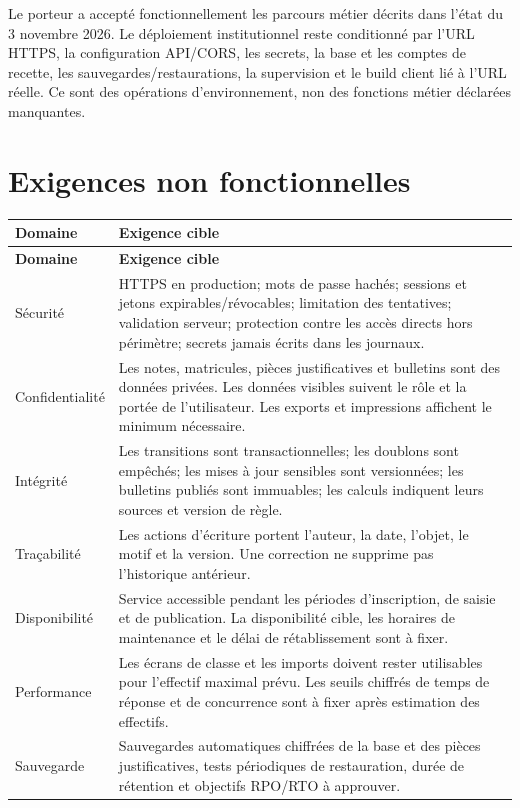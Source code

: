 \documentclass[11pt,a4paper]{article}
\begin{document}
Le porteur a accepté fonctionnellement les parcours métier décrits dans l’état du 3 novembre 2026. Le déploiement institutionnel reste conditionné par l’URL HTTPS, la configuration API/CORS, les secrets, la base et les comptes de recette, les sauvegardes/restaurations, la supervision et le build client lié à l’URL réelle. Ce sont des opérations d’environnement, non des fonctions métier déclarées manquantes.

\section{Exigences non fonctionnelles}

\begin{longtable}{L{3.2cm}L{12.1cm}}
\toprule
\textbf{Domaine} & \textbf{Exigence cible} \\
\midrule
\endfirsthead
\toprule
\textbf{Domaine} & \textbf{Exigence cible} \\
\midrule
\endhead
Sécurité & HTTPS en production; mots de passe hachés; sessions et jetons expirables/révocables; limitation des tentatives; validation serveur; protection contre les accès directs hors périmètre; secrets jamais écrits dans les journaux. \\
Confidentialité & Les notes, matricules, pièces justificatives et bulletins sont des données privées. Les données visibles suivent le rôle et la portée de l'utilisateur. Les exports et impressions affichent le minimum nécessaire. \\
Intégrité & Les transitions sont transactionnelles; les doublons sont empêchés; les mises à jour sensibles sont versionnées; les bulletins publiés sont immuables; les calculs indiquent leurs sources et version de règle. \\
Traçabilité & Les actions d'écriture portent l'auteur, la date, l'objet, le motif et la version. Une correction ne supprime pas l'historique antérieur. \\
Disponibilité & Service accessible pendant les périodes d'inscription, de saisie et de publication. La disponibilité cible, les horaires de maintenance et le délai de rétablissement sont à fixer. \\
Performance & Les écrans de classe et les imports doivent rester utilisables pour l'effectif maximal prévu. Les seuils chiffrés de temps de réponse et de concurrence sont à fixer après estimation des effectifs. \\
Sauvegarde & Sauvegardes automatiques chiffrées de la base et des pièces justificatives, tests périodiques de restauration, durée de rétention et objectifs RPO/RTO à approuver. \\

\end{longtable}
\end{document}
